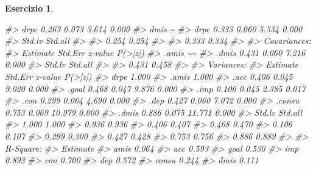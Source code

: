 \documentclass[
  11pt,
]{krantz}
\makeatletter
\newenvironment{Shaded}{\begin{snugshade}}{\end{snugshade}}
\newcommand{\CommentTok}[1]{\textcolor[rgb]{0.37,0.37,0.37}{\textit{#1}}}
\newenvironment{kframe}{%
\medskip{}
\setlength{\fboxsep}{.8em}
 \def\at@end@of@kframe{}%
 \ifinner\ifhmode%
  \def\at@end@of@kframe{\end{minipage}}%
  \begin{minipage}{\columnwidth}%
 \fi\fi%
 \def\FrameCommand##1{\hskip\@totalleftmargin \hskip-\fboxsep
 \colorbox{shadecolor}{##1}\hskip-\fboxsep
     \hskip-\linewidth \hskip-\@totalleftmargin \hskip\columnwidth}%
 \MakeFramed {\advance\hsize-\width
   \@totalleftmargin\z@ \linewidth\hsize
   \@setminipage}}%
 {\par\unskip\endMakeFramed%
 \at@end@of@kframe}
\renewenvironment{Shaded}{\begin{kframe}}{\end{kframe}}
\theoremstyle{definition}
\theoremstyle{definition}
\theoremstyle{definition}
\newtheorem{exercise}{Esercizio}[chapter]
\theoremstyle{definition}
\theoremstyle{remark}
\makeatother
\begin{document}
\begin{exercise}
\begin{Shaded}
\begin{Highlighting}[]
\CommentTok{\#\textgreater{}     drpe              0.263    0.073    3.614    0.000}
\CommentTok{\#\textgreater{}   dmis \textasciitilde{}                                              }
\CommentTok{\#\textgreater{}     drpe              0.333    0.060    5.534    0.000}
\CommentTok{\#\textgreater{}    Std.lv  Std.all}
\CommentTok{\#\textgreater{}                   }
\CommentTok{\#\textgreater{}     0.254    0.254}
\CommentTok{\#\textgreater{}                   }
\CommentTok{\#\textgreater{}     0.333    0.334}
\CommentTok{\#\textgreater{} }
\CommentTok{\#\textgreater{} Covariances:}
\CommentTok{\#\textgreater{}                    Estimate  Std.Err  z{-}value  P(\textgreater{}|z|)}
\CommentTok{\#\textgreater{}  .amis \textasciitilde{}\textasciitilde{}                                             }
\CommentTok{\#\textgreater{}    .dmis              0.431    0.060    7.216    0.000}
\CommentTok{\#\textgreater{}    Std.lv  Std.all}
\CommentTok{\#\textgreater{}                   }
\CommentTok{\#\textgreater{}     0.431    0.458}
\CommentTok{\#\textgreater{} }
\CommentTok{\#\textgreater{} Variances:}
\CommentTok{\#\textgreater{}                    Estimate  Std.Err  z{-}value  P(\textgreater{}|z|)}
\CommentTok{\#\textgreater{}     drpe              1.000                           }
\CommentTok{\#\textgreater{}    .amis              1.000                           }
\CommentTok{\#\textgreater{}    .acc               0.406    0.045    9.020    0.000}
\CommentTok{\#\textgreater{}    .goal              0.468    0.047    9.876    0.000}
\CommentTok{\#\textgreater{}    .imp               0.106    0.045    2.385    0.017}
\CommentTok{\#\textgreater{}    .con               0.299    0.064    4.690    0.000}
\CommentTok{\#\textgreater{}    .dep               0.427    0.060    7.072    0.000}
\CommentTok{\#\textgreater{}    .consu             0.753    0.069   10.979    0.000}
\CommentTok{\#\textgreater{}    .dmis              0.886    0.075   11.771    0.000}
\CommentTok{\#\textgreater{}    Std.lv  Std.all}
\CommentTok{\#\textgreater{}     1.000    1.000}
\CommentTok{\#\textgreater{}     0.936    0.936}
\CommentTok{\#\textgreater{}     0.406    0.407}
\CommentTok{\#\textgreater{}     0.468    0.470}
\CommentTok{\#\textgreater{}     0.106    0.107}
\CommentTok{\#\textgreater{}     0.299    0.300}
\CommentTok{\#\textgreater{}     0.427    0.428}
\CommentTok{\#\textgreater{}     0.753    0.756}
\CommentTok{\#\textgreater{}     0.886    0.889}
\CommentTok{\#\textgreater{} }
\CommentTok{\#\textgreater{} R{-}Square:}
\CommentTok{\#\textgreater{}                    Estimate}
\CommentTok{\#\textgreater{}     amis              0.064}
\CommentTok{\#\textgreater{}     acc               0.593}
\CommentTok{\#\textgreater{}     goal              0.530}
\CommentTok{\#\textgreater{}     imp               0.893}
\CommentTok{\#\textgreater{}     con               0.700}
\CommentTok{\#\textgreater{}     dep               0.572}
\CommentTok{\#\textgreater{}     consu             0.244}
\CommentTok{\#\textgreater{}     dmis              0.111}
\end{Highlighting}
\end{Shaded}


\end{exercise}
\end{document}
